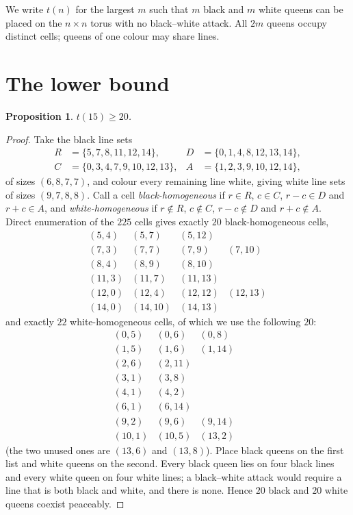 \documentclass[11pt]{amsart}
\newtheorem{proposition}[theorem]{Proposition}
\theoremstyle{remark}
\begin{document}
We write $t(n)$ for the largest $m$ such that $m$ black and $m$ white queens can be placed on the $n\times n$ torus with no black--white attack. All $2m$ queens occupy distinct cells; queens of one colour may share lines.

\section{The lower bound}\label{sec:lower}

\begin{proposition}\label{prop:lower}
$t(15)\ge 20$.
\end{proposition}

\begin{proof}
Take the black line sets
\begin{equation}\label{eq:witness}
\begin{aligned}
R&=\{5,7,8,11,12,14\}, & D&=\{0,1,4,8,12,13,14\},\\
C&=\{0,3,4,7,9,10,12,13\}, & A&=\{1,2,3,9,10,12,14\},
\end{aligned}
\end{equation}
of sizes $(6,8,7,7)$, and colour every remaining line white, giving white line sets of sizes $(9,7,8,8)$. Call a cell \emph{black-homogeneous} if $r\in R$, $c\in C$, $r-c\in D$ and $r+c\in A$, and \emph{white-homogeneous} if $r\notin R$, $c\notin C$, $r-c\notin D$ and $r+c\notin A$. Direct enumeration of the $225$ cells gives exactly $20$ black-homogeneous cells,
\[
\begin{array}{llll}
(5,4)&(5,7)&(5,12)&\\
(7,3)&(7,7)&(7,9)&(7,10)\\
(8,4)&(8,9)&(8,10)&\\
(11,3)&(11,7)&(11,13)&\\
(12,0)&(12,4)&(12,12)&(12,13)\\
(14,0)&(14,10)&(14,13)&
\end{array}
\]
and exactly $22$ white-homogeneous cells, of which we use the following $20$:
\[
\begin{array}{llll}
(0,5)&(0,6)&(0,8)&\\
(1,5)&(1,6)&(1,14)&\\
(2,6)&(2,11)&&\\
(3,1)&(3,8)&&\\
(4,1)&(4,2)&&\\
(6,1)&(6,14)&&\\
(9,2)&(9,6)&(9,14)&\\
(10,1)&(10,5)&(13,2)&
\end{array}
\]
(the two unused ones are $(13,6)$ and $(13,8)$). Place black queens on the first list and white queens on the second. Every black queen lies on four black lines and every white queen on four white lines; a black--white attack would require a line that is both black and white, and there is none. Hence $20$ black and $20$ white queens coexist peaceably.
\end{proof}
\end{document}
